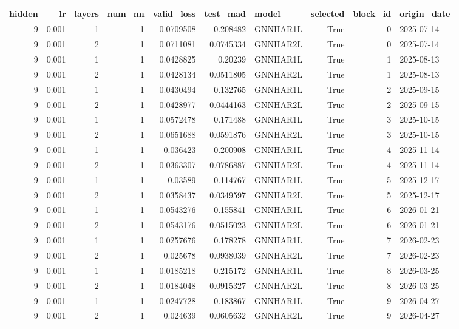 \begin{tabular}{rrrrrrlrrl}
\toprule
hidden & lr & layers & num_nn & valid_loss & test_mad & model & selected & block_id & origin_date \\
\midrule
9 & 0.001 & 1 & 1 & 0.0709508 & 0.208482 & GNNHAR1L & True & 0 & 2025-07-14 \\
9 & 0.001 & 2 & 1 & 0.0711081 & 0.0745334 & GNNHAR2L & True & 0 & 2025-07-14 \\
9 & 0.001 & 1 & 1 & 0.0428825 & 0.20239 & GNNHAR1L & True & 1 & 2025-08-13 \\
9 & 0.001 & 2 & 1 & 0.0428134 & 0.0511805 & GNNHAR2L & True & 1 & 2025-08-13 \\
9 & 0.001 & 1 & 1 & 0.0430494 & 0.132765 & GNNHAR1L & True & 2 & 2025-09-15 \\
9 & 0.001 & 2 & 1 & 0.0428977 & 0.0444163 & GNNHAR2L & True & 2 & 2025-09-15 \\
9 & 0.001 & 1 & 1 & 0.0572478 & 0.171488 & GNNHAR1L & True & 3 & 2025-10-15 \\
9 & 0.001 & 2 & 1 & 0.0651688 & 0.0591876 & GNNHAR2L & True & 3 & 2025-10-15 \\
9 & 0.001 & 1 & 1 & 0.036423 & 0.200908 & GNNHAR1L & True & 4 & 2025-11-14 \\
9 & 0.001 & 2 & 1 & 0.0363307 & 0.0786887 & GNNHAR2L & True & 4 & 2025-11-14 \\
9 & 0.001 & 1 & 1 & 0.03589 & 0.114767 & GNNHAR1L & True & 5 & 2025-12-17 \\
9 & 0.001 & 2 & 1 & 0.0358437 & 0.0349597 & GNNHAR2L & True & 5 & 2025-12-17 \\
9 & 0.001 & 1 & 1 & 0.0543276 & 0.155841 & GNNHAR1L & True & 6 & 2026-01-21 \\
9 & 0.001 & 2 & 1 & 0.0543176 & 0.0515023 & GNNHAR2L & True & 6 & 2026-01-21 \\
9 & 0.001 & 1 & 1 & 0.0257676 & 0.178278 & GNNHAR1L & True & 7 & 2026-02-23 \\
9 & 0.001 & 2 & 1 & 0.025678 & 0.0938039 & GNNHAR2L & True & 7 & 2026-02-23 \\
9 & 0.001 & 1 & 1 & 0.0185218 & 0.215172 & GNNHAR1L & True & 8 & 2026-03-25 \\
9 & 0.001 & 2 & 1 & 0.0184048 & 0.0915327 & GNNHAR2L & True & 8 & 2026-03-25 \\
9 & 0.001 & 1 & 1 & 0.0247728 & 0.183867 & GNNHAR1L & True & 9 & 2026-04-27 \\
9 & 0.001 & 2 & 1 & 0.024639 & 0.0605632 & GNNHAR2L & True & 9 & 2026-04-27 \\

\end{tabular}
